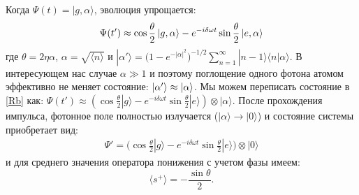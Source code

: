 Когда $\Psi(t) = |g,\alpha\rangle$, эволюция упрощается:  
\begin{equation}
	\Psi(t') \approx \cos\frac{\theta}{2} \ket{g, \alpha} - e^{-i\delta\omega t} \sin \frac{\theta}{2} \ket{e, \alpha}
	\label{Rb}
\end{equation}
где $\theta = 2\eta\alpha$, $\alpha = \sqrt{\langle n\rangle}$ и $|\alpha'\rangle = \Big(1-e^{-|\alpha |^2}\Big)^{-1/2}\sum_{n=1}^\infty |n-1\rangle\langle n|\alpha\rangle $. В интересующем нас случае $\alpha \gg 1$ и поэтому поглощение одного фотона атомом эффективно не меняет состояние: $\ket{\alpha'} \approx \ket{\alpha}$. Мы можем переписать состояние в \eqref{Rb} как: 
$\Psi(t') \approx (\cos\frac{\theta}{2} |g\rangle - e^{-i\delta\omega t}\sin \frac{\theta}{2} |e\rangle)\otimes |\alpha\rangle$. После прохождения импульса, фотонное поле полностью излучается ($|\alpha\rangle \rightarrow |0\rangle$) и состояние системы приобретает вид:   
\begin{equation}
	\begin{split}
		\Psi' = \bigg(\cos\frac{\theta}{2} |g\rangle - e^{-i\delta\omega t}\sin \frac{\theta}{2} |e\rangle\bigg)\otimes |0\rangle 	
	\end{split}
	\label{Rb2}
\end{equation}
и для среднего значения оператора понижения с учетом фазы имеем:
\begin{equation}
	\langle s^+ \rangle = -\frac{\sin{\theta}}{2}.
	\label{sp}
\end{equation}

